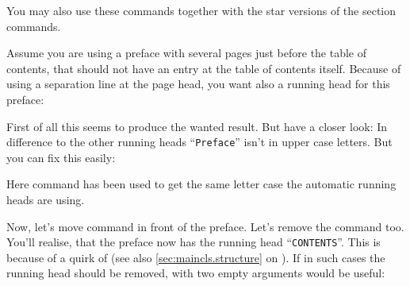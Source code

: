 You may also use these commands together with the star versions of the section
commands.%
%
\begin{Example}
  Assume you are using a preface with several pages just before the table of
  contents, that should not have an entry at the table of contents
  itself. Because of using a separation line at the page head, you want also a
  running head for this preface:
  First of all this seems to produce the wanted result. But have a closer
  look: In difference to the other running heads ``\texttt{Preface}'' isn't in
  upper case letters. But you can fix this easily:
  Here command  has been used to get the same letter case
  the automatic running heads are using.

  Now, let's move command  in front of the
  preface. Let's remove the  command too. You'll realise, that
  the preface now has the running head ``\texttt{CONTENTS}''. This is because
  of a quirk of  (see also \autoref{sec:maincls.structure} on
  ). If in such cases the running head
  should be removed,  with two empty arguments would be
  useful:
\end{Example}
%
%
%
%

